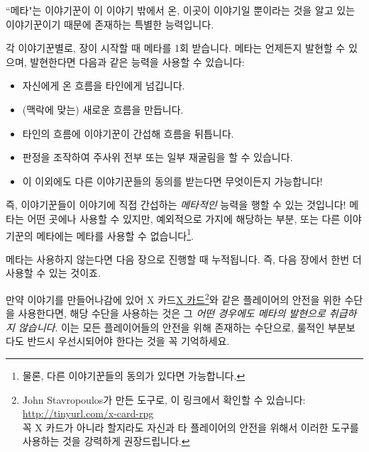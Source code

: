 \documentclass{report}
\begin{document}
	``메타"는 이야기꾼이 이 이야기 밖에서 온, 이곳이 이야기일 뿐이라는 것을 알고 있는 이야기꾼이기 때문에 존재하는 특별한 능력입니다.
	
	각 이야기꾼별로, 장이 시작할 때 메타를 1회 받습니다. 메타는 언제든지 발현할 수 있으며, 발현한다면 다음과 같은 능력을 사용할 수 있습니다:
	\begin{itemize}
		\item 자신에게 온 흐름을 타인에게 넘깁니다.
		\item (맥락에 맞는) 새로운 흐름을 만듭니다.
		\item 타인의 흐름에 이야기꾼이 간섭해 흐름을 뒤틉니다.
		\item 판정을 조작하여 주사위 전부 또는 일부 재굴림을 할 수 있습니다.
		\item 이 이외에도 다른 이야기꾼들의 동의를 받는다면 무엇이든지 가능합니다!
	\end{itemize}
	즉, 이야기꾼들이 이야기에 직접 간섭하는 \emph{메타적인} 능력을 행할 수 있는 것입니다! 메타는 어떤 곳에나 사용할 수 있지만, 예외적으로 가지에 해당하는 부분, 또는 다른 이야기꾼의 메타에는 메타를 사용할 수 없습니다\footnote{물론, 다른 이야기꾼들의 동의가 있다면 가능합니다.}.
	
	메타는 사용하지 않는다면 다음 장으로 진행할 때 누적됩니다. 즉, 다음 장에서 한번 더 사용할 수 있는 것이죠.
	
	만약 이야기를 만들어나감에 있어 \ifprintout X 카드\else\href{http://tinyurl.com/x-card-rpg}{X 카드}\fi\footnote{John Stavropoulos가 만든 도구로, 이 링크에서 확인할 수 있습니다: \url{http://tinyurl.com/x-card-rpg} \\ 꼭 X 카드가 아니라 할지라도 자신과 타 플레이어의 안전을 위해서 이러한 도구를 사용하는 것을 강력하게 권장드립니다.}와 같은 플레이어의 안전을 위한 수단을 사용한다면, 해당 수단을 사용하는 것은 그 \emph{어떤 경우에도 메타의 발현으로 취급하지 않습니다}. 이는 모든 플레이어들의 안전을 위해 존재하는 수단으로, 룰적인 부분보다도 반드시 우선시되어야 한다는 것을 꼭 기억하세요.
\end{document}

